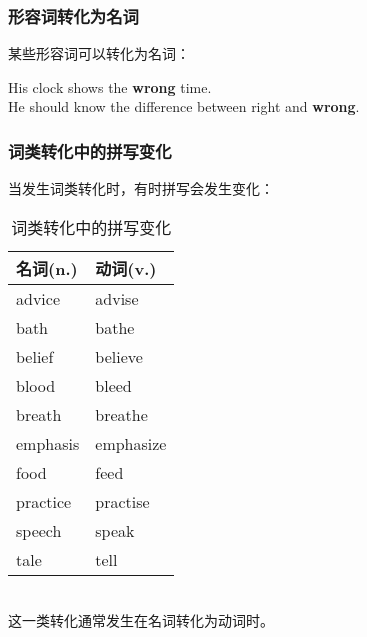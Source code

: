 \documentclass[UTF8]{ctexart}
\begin{document}
\subsubsection{形容词转化为名词}
    某些形容词可以转化为名词：
    \begin{center}
        \large\ttfamily
        His clock shows the \textbf{wrong} time.\\[3mm]
        He should know the difference between right and \textbf{wrong}.\\
    \end{center}\vspace{15pt}

\subsubsection{词类转化中的拼写变化}
    当发生词类转化时，有时拼写会发生变化：\vspace{5pt}
    \begin{table}[h]
        \begin{center}
            \ttfamily
            \begin{tabular}{p{80pt}|p{80pt}}
                \hline
                名词(n.)&动词(v.)\\ \hline
                advice&advise\\ \hline
                bath&bathe\\ \hline
                belief&believe\\ \hline
                blood&bleed\\ \hline
                breath&breathe\\ \hline
                emphasis&emphasize\\ \hline
                food&feed\\ \hline
                practice&practise\\ \hline
                speech&speak\\ \hline
                tale&tell\\ \hline
            \end{tabular}
            \rmfamily
            \caption{词类转化中的拼写变化}
        \end{center}
    \end{table}\\
    这一类转化通常发生在名词转化为动词时。

\newpage
\end{document}
